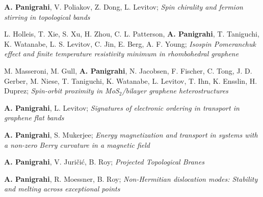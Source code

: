 

\begin{cventries}

  \cventry
    {} %
    {} %
    {} %
    {} %
    {
	  \begin{cvitems} %
	  	\item{\textbf{A. Panigrahi}, V. Poliakov, Z. Dong, L. Levitov; \textit{Spin chirality and fermion stirring in topological bands}
	  		 }
	  	\item{L. Holleis, T. Xie, S. Xu, H. Zhou, C. L. Patterson, \textbf{A. Panigrahi}, T. Taniguchi, K. Watanabe, L. S. Levitov, C. Jin, E. Berg, A. F. Young; \textit{Isospin Pomeranchuk effect and finite temperature resistivity minimum in rhombohedral graphene}
	  	}
	  	\item{M. Masseroni, M. Gull, \textbf{A. Panigrahi}, N. Jacobsen, F. Fischer, C. Tong, J. D. Gerber, M. Niese, T. Taniguchi, K. Watanabe, L. Levitov, T. Ihn, K. Ensslin, H. Duprez; \textit{Spin-orbit proximity in MoS$_2$/bilayer graphene heterostructures}
	  		}
	  	\item{\textbf{A. Panigrahi}, L. Levitov; \textit{Signatures of electronic ordering in transport in graphene flat bands} }
	  	\item{\textbf{A. Panigrahi}, S. Mukerjee; \textit{Energy magnetization and transport in systems with a non-zero Berry curvature in a magnetic field}
	  	}
	  	\item{\textbf{A. Panigrahi}, V. Juri\v{c}i\'c, B. Roy; \textit{Projected Topological Branes}}
      	\item{\textbf{A. Panigrahi}, R. Moessner, B. Roy; \textit{Non-Hermitian dislocation modes: Stability and melting across exceptional points} }
      \end{cvitems}
    }


\end{cventries}
